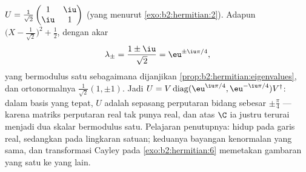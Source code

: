 \begin{example}\label{ex:b2:hermitian:unitary}
$U = \frac{1}{\sqrt2}\begin{pmatrix} 1 & \iu\\ \iu & 1
\end{pmatrix}$ (yang  menurut \cref{exo:b2:hermitian:2}). Adapun
 $\bigl(X - \frac{1}{\sqrt2}\bigr)^2
+ \frac12$, dengan akar
\[
\lambda_\pm = \frac{1 \pm \iu}{\sqrt2} = \eu^{\pm\iu\pi/4},
\]
yang bermodulus satu sebagaimana dijanjikan \cref{prop:b2:hermitian:eigenvalues},
dan  ortonormalnya $\frac{1}{\sqrt2}(1, \pm1)$. Jadi $U =
V\operatorname{diag}(\eu^{\iu\pi/4},
\eu^{-\iu\pi/4})V^\dagger$: dalam basis yang tepat, $U$ adalah sepasang
perputaran bidang sebesar $\pm\frac\pi4$ --- karena matriks perputaran real tak
punya  real, dan atas $\C$ ia justru terurai menjadi dua
skalar bermodulus satu. Pelajaran penutupnya:   hidup pada
garis real, sedangkan   pada lingkaran satuan; keduanya
bayangan kenormalan yang sama, dan transformasi Cayley pada
\cref{exo:b2:hermitian:6} memetakan gambaran yang satu ke yang lain.
\end{example}

